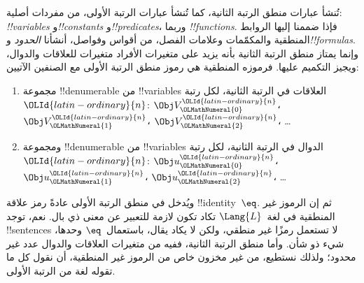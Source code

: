 \documentclass[../../../include/open-logic-section]{subfiles}
\begin{document}


تُنشأ عبارات منطق الرتبة الثانية، كما تُنشأ عبارات الرتبة الأولى، من
مفردات أصلية: \emph{!!{variable}s} و\emph{!!{constant}s}
و\emph{!!{predicate}s}، وربما \emph{!!{function}s}. فإذا ضممنا إليها
الروابط المنطقية والمكمّمات وعلامات الفصل، من أقواس وفواصل، أنشأنا
\emph{الحدود} و\emph{!!{formula}s}. وإنما يمتاز منطق الرتبة الثانية بأنه
يزيد على متغيرات الأفراد متغيرات للعلاقات والدوال، ويجيز التكميم عليها.
فرموزه المنطقية هي رموز منطق الرتبة الأولى مع الصنفين الآتيين:

\begin{enumerate}
\item مجموعة !!{denumerable} من !!{variable}s العلاقات في الرتبة الثانية،
  لكل رتبة~$\OLId{latin-ordinary}{n}$: $\Obj V_\OLMathNumeral{0}^\OLId{latin-ordinary}{n}$، $\Obj V_\OLMathNumeral{1}^\OLId{latin-ordinary}{n}$، $\Obj V_\OLMathNumeral{2}^\OLId{latin-ordinary}{n}$، \dots
\item ومجموعة !!{denumerable} من !!{variable}s الدوال في الرتبة الثانية،
  لكل رتبة~$\OLId{latin-ordinary}{n}$: $\Obj u_\OLMathNumeral{0}^\OLId{latin-ordinary}{n}$، $\Obj u_\OLMathNumeral{1}^\OLId{latin-ordinary}{n}$، $\Obj u_\OLMathNumeral{2}^\OLId{latin-ordinary}{n}$، \dots
\end{enumerate}

ويُدخل في منطق الرتبة الأولى عادةً رمز علاقة !!{identity}~$\eq$. ثم إن
الرموز غير المنطقية في لغة~$\Lang{L}$ تكاد تكون لازمة للتعبير عن معنى
ذي بال. نعم، توجد !!{sentence}s لا تستعمل رمزًا غير منطقي، ولكن لا يكاد
يقال، باستعمال~$\eq$ وحدها، شيء ذو شأن. وأما منطق الرتبة الثانية، ففيه
من متغيرات العلاقات والدوال عدد غير محدود؛ ولذلك نستطيع، من غير مخزون
خاص من الرموز غير المنطقية، أن نقول كل ما تقوله لغة من الرتبة الأولى.
\end{document}
